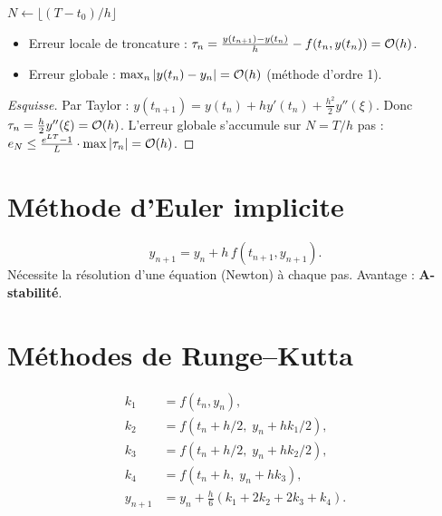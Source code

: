 \begin{algorithm}[H]
\caption{Euler explicite}\label{alg:euler}
$N\gets\lfloor(T-t_0)/h\rfloor$\;
\end{algorithm}

\begin{theoreme}
\begin{itemize}
\item Erreur locale de troncature : $\tau_n=\frac{y(t_{n+1})-y(t_n)}{h}-f(t_n,y(t_n))=\mathcal{O}(h)$.
\item Erreur globale : $\max_n|y(t_n)-y_n|=\mathcal{O}(h)$ (m\'ethode d'ordre 1).
\end{itemize}
\end{theoreme}

\begin{proof}[Esquisse]
Par Taylor : $y(t_{n+1})=y(t_n)+hy'(t_n)+\frac{h^2}{2}y''(\xi)$. Donc $\tau_n=\frac{h}{2}y''(\xi)=\mathcal{O}(h)$. L'erreur globale s'accumule sur $N=T/h$ pas : $e_N\leq\frac{e^{LT}-1}{L}\cdot\max|\tau_n|=\mathcal{O}(h)$.
\end{proof}

\section{M\'ethode d'Euler implicite}

\begin{definition}
\[
y_{n+1} = y_n + h\,f(t_{n+1},y_{n+1}).
\]
N\'ecessite la r\'esolution d'une \'equation (Newton) \`a chaque pas. Avantage : \textbf{A-stabilit\'e}.
\end{definition}

\section{M\'ethodes de Runge--Kutta}

\begin{definition}[RK4 classique]
\begin{align}
k_1 &= f(t_n,y_n), \\
k_2 &= f(t_n+h/2,\; y_n+hk_1/2), \\
k_3 &= f(t_n+h/2,\; y_n+hk_2/2), \\
k_4 &= f(t_n+h,\; y_n+hk_3), \\
y_{n+1} &= y_n + \frac{h}{6}(k_1+2k_2+2k_3+k_4).
\end{align}
\end{definition}


